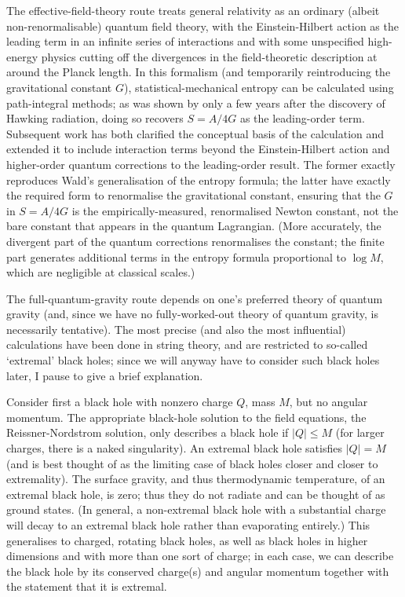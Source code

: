 \documentclass[12pt]{article}
\begin{document}
The effective-field-theory route treats general relativity as an ordinary (albeit non-renormalisable) quantum field theory, with the Einstein-Hilbert action as the leading term in an infinite series of interactions and with some unspecified high-energy physics cutting off the divergences in the field-theoretic description at around the Planck length. In this formalism (and temporarily reintroducing the gravitational constant $G$), statistical-mechanical entropy can be calculated using path-integral methods; as was shown by  only a few years after the discovery of Hawking radiation, doing so recovers $S=A/4G$ as the leading-order term. Subsequent work has both clarified the conceptual basis of the calculation and extended it to include interaction terms beyond the Einstein-Hilbert action and higher-order quantum corrections to the leading-order result. The former exactly reproduces Wald's generalisation of the entropy formula; the latter have exactly the required form to renormalise the gravitational constant, ensuring that the $G$ in $S=A/4G$ is the empirically-measured, renormalised Newton constant, not the bare constant that appears in the quantum Lagrangian. (More accurately, the divergent part of the quantum corrections renormalises the constant; the finite part generates additional terms in the entropy formula proportional to $\log M$, which are negligible at classical scales.)

The full-quantum-gravity route depends on one's preferred theory of quantum gravity (and, since we have no fully-worked-out theory of quantum gravity, is necessarily tentative). The most precise (and also the most influential) calculations have been done in string theory, and are restricted to so-called `extremal' black holes; since we will anyway have to consider such black holes later, I pause to give a brief explanation.

Consider first a black hole with nonzero charge $Q$, mass $M$, but no angular momentum. The appropriate black-hole solution to the field equations, the Reissner-Nordstrom solution, only describes a black hole if $|Q|\leq M$ (for larger charges, there is a naked singularity). An extremal black hole satisfies $|Q|=M$ (and is best thought of as the limiting case of black holes closer and closer to extremality). The surface gravity, and thus thermodynamic temperature, of an extremal black hole, is zero; thus they do not radiate and can be thought of as ground states. (In general, a non-extremal black hole with a substantial charge will decay to an extremal black hole rather than evaporating entirely.) This generalises to charged, rotating black holes, as well as black holes in higher dimensions and with more than one sort of charge; in each case, we can describe the black hole by its conserved charge(s) and angular momentum together with the statement that it is extremal.
\end{document}
